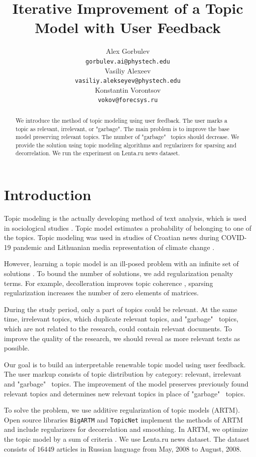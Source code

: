 \documentclass{article}
\title{Iterative Improvement of a Topic Model with User Feedback}
\author{ Alex Gorbulev \\
	\texttt{gorbulev.ai@phystech.edu} \\
	\And
	Vasiliy Alexeev \\
	\texttt{vasiliy.alekseyev@phystech.edu} \\
	\And
    Konstantin Vorontsov \\
    \texttt{vokov@forecsys.ru} \\
}
\date{}
\begin{document}
\maketitle

\begin{abstract}
    We introduce the method of topic modeling using user feedback. The user marks a topic as relevant, irrelevant, or "garbage". The main problem is to improve the base model preserving relevant topics. The number of "garbage" \ topics should decrease. We provide the solution using topic modeling algorithms and regularizers for sparsing and decorrelation. We run the experiment on Lenta.ru news dataset.
\end{abstract}


\section{Introduction}
Topic modeling is the actually developing \citep{10031921} method of text analysis, which is used in sociological studies \citep{DIMAGGIO2013570}.
Topic model estimates a probability of belonging to one of the topics.
Topic modeling was used in studies of Croatian news during COVID-19 pandemic \citep{pandemic2021} and Lithuanian media representation of climate change \citep{climate2021}.

However, learning a topic model is an ill-posed problem with an infinite set of solutions \citep{bigartm}.
To bound the number of solutions, we add regularization penalty terms.
For example, decolleration improves topic coherence \citep{artm2}, sparsing regularization increases the number of zero elements of matrices.

During the study period, only a part of topics could be relevant.
At the same time, irrelevant topics, which duplicate relevant topics, and "garbage" \ topics, which are not related to the research, could contain relevant documents. To improve the quality of the research, we should reveal as more relevant texts as possible.

Our goal is to build an interpretable renewable topic model using user feedback.
The user markup consists of topic distribution by category: relevant, irrelevant and "garbage" \ topics. The improvement of the model preserves previously found relevant topics and determines new relevant topics in place of "garbage" \ topics.

To solve the problem, we use additive regularization of topic models (ARTM). Open source libraries \texttt{BigARTM} and \texttt{TopicNet} \citep{bulatov-etal-2020-topicnet} implement the methods of ARTM and include regularizers for decorrelation and smoothing. In ARTM, we optimize the topic model by a sum of criteria \citep{artm}. We use Lenta.ru news dataset. The dataset consists of $16449$ articles in Russian language from May, 2008 to August, 2008.
\end{document}
